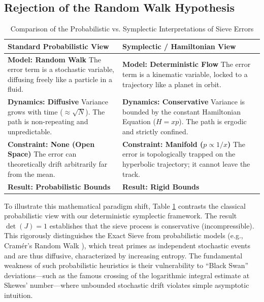 \documentclass[sn-mathphys-num, pdflatex]{sn-jnl}
\begin{document}
\subsection{Rejection of the Random Walk Hypothesis}
\begin{table}[ht]
\small
\centering
\caption{Comparison of the Probabilistic vs. Symplectic Interpretations of Sieve Errors}
\label{tab:comparison}
\renewcommand{\arraystretch}{1.2}
\setlength{\tabcolsep}{36pt}
\begin{tabular}{|>{\raggedright\arraybackslash}p{3cm}|>{\raggedright\arraybackslash}p{3cm}|}
\toprule
\textbf{Standard Probabilistic View} & \textbf{Symplectic / Hamiltonian View} \\
\midrule
\textbf{Model: Random Walk} \newline The error term is a stochastic variable, diffusing freely like a particle in a fluid. & \textbf{Model: Deterministic Flow} \newline The error term is a kinematic variable, locked to a trajectory like a planet in orbit. \\
\midrule
\textbf{Dynamics: Diffusive} \newline Variance grows with time ($\approx \sqrt{N}$). The path is non-repeating and unpredictable. & \textbf{Dynamics: Conservative} \newline Variance is bounded by the constant Hamiltonian Equation ($H=xp$). The path is ergodic and strictly confined. \\
\midrule
\textbf{Constraint: None (Open Space)} \newline The error can theoretically drift arbitrarily far from the mean. & \textbf{Constraint: Manifold ($p \propto 1/x$)} \newline The error is topologically trapped on the hyperbolic trajectory; it cannot leave the track. \\
\midrule
\textbf{Result: Probabilistic Bounds} & \textbf{Result: Rigid Bounds} \\
\bottomrule
\end{tabular}
\end{table}

To illustrate this mathematical paradigm shift, Table \ref{tab:comparison} contrasts the classical probabilistic view with our deterministic symplectic framework. The result $\det(J) = 1$ establishes that the sieve process is conservative (incompressible). This rigorously distinguishes the Exact Sieve from probabilistic models (e.g., Cram\'{e}r's Random Walk \cite{cramer1936order}), which treat primes as independent stochastic events and are thus diffusive, characterized by increasing entropy. The fundamental weakness of such probabilistic heuristics is their vulnerability to ``Black Swan'' deviations---such as the famous crossing of the logarithmic integral estimate at Skewes' number---where unbounded stochastic drift violates simple asymptotic intuition.
\end{document}
